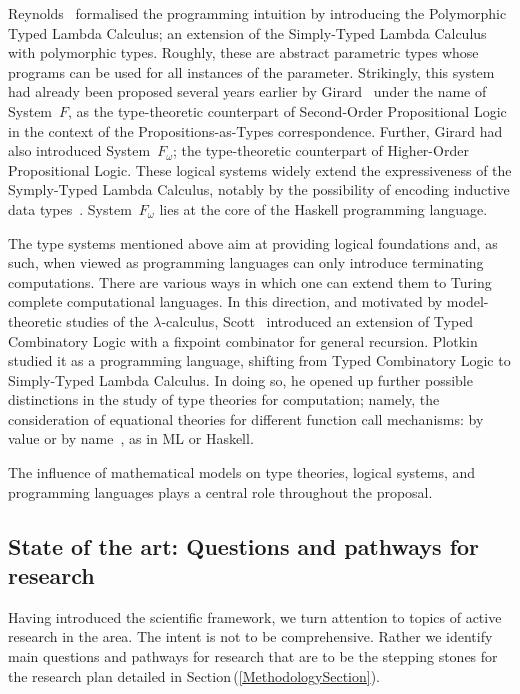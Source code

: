 \documentclass[11pt,twocolumn]{article}
\newcommand{\pref}[1]{\,(\ref{#1})}
\newcommand{\lcalculus}{\mbox{$\lambda$-calculus}}
\newcommand{\SystemF}{\mbox{System~$F$}}
\newcommand{\SystemFomega}{\mbox{System~$F_\omega$}}
\begin{document}
Reynolds~\cite{Reynolds} formalised the programming intuition by introducing
the Polymorphic Typed Lambda Calculus; an extension of the Simply-Typed Lambda
Calculus with polymorphic types.  Roughly, these are abstract parametric types
whose programs can be used for all instances of the parameter.  Strikingly,
this system had already been proposed several years earlier by
Girard~\cite{GirardSystemF} under the name of {\SystemF}, as the
type-theoretic counterpart of Second-Order Propositional Logic in the
context of the Propositions-as-Types correspondence.  Further, Girard had
also introduced {\SystemFomega}; the type-theoretic counterpart of
Higher-Order Propositional Logic.  These logical systems widely extend the
expressiveness of the Symply-Typed Lambda Calculus, notably by the
possibility of encoding inductive data types~\cite{BoehmBerarducci}.
{\SystemFomega} lies at the core of the Haskell programming
language. %

The type systems mentioned above aim at providing logical foundations and, as
such, when viewed as programming languages can only introduce terminating
computations.  There are various ways in which one can extend them to Turing
complete computational languages.  In this direction, and motivated by
model-theoretic studies of the \lcalculus, Scott~\cite{ScottTCS}
introduced an extension of Typed Combinatory Logic with a fixpoint
combinator for general recursion.  Plotkin~\cite{PlotkinLCF} studied it as a
programming language, shifting from Typed Combinatory Logic to Simply-Typed
Lambda Calculus.  In doing so, he opened up further possible distinctions in
the study of type theories for computation; namely, the consideration of
equational theories for different function call mechanisms: by value or by
name~\cite{PlotkinCBVCBN}, as in ML or Haskell.  

The influence of mathematical models on type theories, logical systems, and
programming languages %
plays a central role throughout the proposal.

\subsection{State of the art: Questions and pathways for research}
\label{StateOfTheArtSubsection}

Having introduced the scientific framework, we turn attention to topics of
active research in the area.  The intent is not to be comprehensive.
Rather we identify main questions and pathways for research that are to be
the stepping stones for the research plan detailed in
Section\pref{MethodologySection}.
\end{document}
